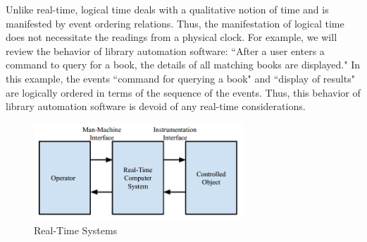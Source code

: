 \documentclass[12pt]{report}
\begin{document}
Unlike real-time, logical time deals with a qualitative notion of time and is manifested by event ordering relations. Thus, the manifestation of logical time does not necessitate the readings from a physical clock. For example, we will review the behavior of library automation software: ``After a user enters a command to query for a book, the details of all matching books are displayed." In this example, the events  ``command for querying a book" and ``display of results" are logically ordered in terms of the sequence of the events. Thus, this behavior of library automation software is devoid of any real-time considerations.

\begin{figure}[h]
    \centering
    \includegraphics[width=0.7\textwidth]{images/real-time-sys.png}
    \caption{Real-Time Systems}
    \label{fig:rts}
\end{figure}
\end{document}

